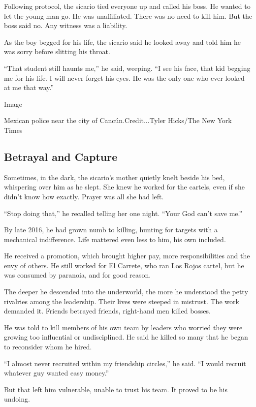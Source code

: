 Following protocol, the sicario tied everyone up and called his boss. He
wanted to let the young man go. He was unaffiliated. There was no need
to kill him. But the boss said no. Any witness was a liability.

As the boy begged for his life, the sicario said he looked away and told
him he was sorry before slitting his throat.

``That student still haunts me,'' he said, weeping. ``I see his face,
that kid begging me for his life. I will never forget his eyes. He was
the only one who ever looked at me that way.''

Image

Mexican police near the city of Cancún.Credit...Tyler Hicks/The New York
Times

\hypertarget{betrayal-and-capture}{%
\subsection{Betrayal and Capture}\label{betrayal-and-capture}}

Sometimes, in the dark, the sicario's mother quietly knelt beside his
bed, whispering over him as he slept. She knew he worked for the
cartels, even if she didn't know how exactly. Prayer was all she had
left.

``Stop doing that,'' he recalled telling her one night. ``Your God can't
save me.''

By late 2016, he had grown numb to killing, hunting for targets with a
mechanical indifference. Life mattered even less to him, his own
included.

He received a promotion, which brought higher pay, more responsibilities
and the envy of others. He still worked for El Carrete, who ran Los
Rojos cartel, but he was consumed by paranoia, and for good reason.

The deeper he descended into the underworld, the more he understood the
petty rivalries among the leadership. Their lives were steeped in
mistrust. The work demanded it. Friends betrayed friends, right-hand men
killed bosses.

He was told to kill members of his own team by leaders who worried they
were growing too influential or undisciplined. He said he killed so many
that he began to reconsider whom he hired.

``I almost never recruited within my friendship circles,'' he said. ``I
would recruit whatever guy wanted easy money.''

But that left him vulnerable, unable to trust his team. It proved to be
his undoing.

